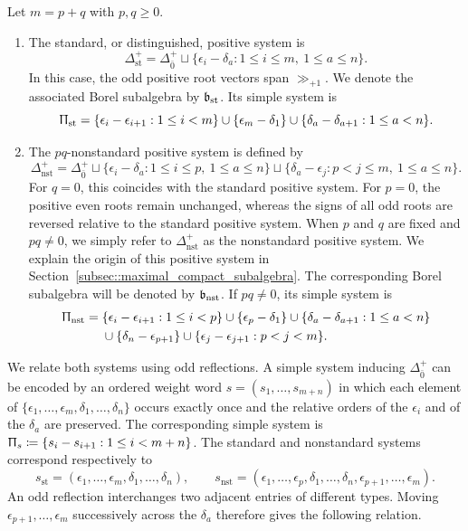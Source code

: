 \begin{example}\label{ex::systems} Let $m=p+q$ with $p,q\geq 0$. \begin{enumerate} \item[(a)] The standard, or distinguished, positive system is $$ \Delta_{\mathrm{st}}^+ =\Delta_{\bar{0}}^+\sqcup \{\epsilon_i-\delta_a:1\leq i\leq m,\ 1\leq a\leq n\}. $$
In this case, the odd positive root vectors span $\gg_{+1}$. We denote the associated Borel subalgebra by ${\mathfrak b}_{\text{st}}$. Its simple system is $$ \Uppi_{\mathrm{st}} =\{\epsilon_i-\epsilon_{i+1}:1\leq i<m\} \cup\{\epsilon_m-\delta_1\} \cup\{\delta_a-\delta_{a+1}:1\leq a<n\}. $$ 

\item[(b)] The $pq$-nonstandard positive system is defined by
\[
\Delta_{\mathrm{nst}}^+
=
\Delta_{\bar0}^+
\sqcup
\{\epsilon_i-\delta_a:1\leq i\leq p,\ 1\leq a\leq n\}
\sqcup
\{\delta_a-\epsilon_j:p<j\leq m,\ 1\leq a\leq n\}.
\]
For $q=0$, this coincides with the standard positive system. For $p=0$, the positive even roots remain unchanged, whereas the signs of all odd roots are reversed relative to the standard positive system. When $p$ and $q$ are fixed and $pq\neq 0$, we simply refer to $\Delta_{\mathrm{nst}}^+$ as the nonstandard positive system. We explain the origin of this positive system in Section~\ref{subsec::maximal_compact_subalgebra}. The corresponding Borel subalgebra will be denoted by ${\mathfrak b}_{\mathrm{nst}}$. If $pq\neq 0$, its simple system is $$ \begin{aligned} \Uppi_{\mathrm{nst}} ={}&\{\epsilon_i-\epsilon_{i+1}:1\leq i<p\} \cup\{\epsilon_p-\delta_1\} \cup\{\delta_a-\delta_{a+1}:1\leq a<n\}\\ &\cup\{\delta_n-\epsilon_{p+1}\} \cup\{\epsilon_j-\epsilon_{j+1}:p<j<m\}. \end{aligned} $$ \end{enumerate} \end{example}

We relate both systems using odd reflections. A simple system inducing $\Delta_{\bar0}^+$ can be encoded by an ordered weight word $s=(s_1,\ldots,s_{m+n})$ in which each element of $\{\epsilon_1,\ldots,\epsilon_m,\delta_1,\ldots,\delta_n\}$ occurs exactly once and the relative orders of the $\epsilon_i$ and of the $\delta_a$ are preserved. The corresponding simple system is $\Uppi_s\coloneqq\{s_i-s_{i+1}:1\leq i<m+n\}$. The standard and nonstandard systems correspond respectively to
\begin{equation}
s_{\mathrm{st}}
=
(\epsilon_1,\ldots,\epsilon_m,\delta_1,\ldots,\delta_n),
\qquad
s_{\mathrm{nst}}
=
(\epsilon_1,\ldots,\epsilon_p,\delta_1,\ldots,\delta_n,
\epsilon_{p+1},\ldots,\epsilon_m).
\end{equation}
An odd reflection interchanges two adjacent entries of different types. Moving $\epsilon_{p+1},\ldots,\epsilon_m$ successively across the $\delta_a$ therefore gives the following relation.

